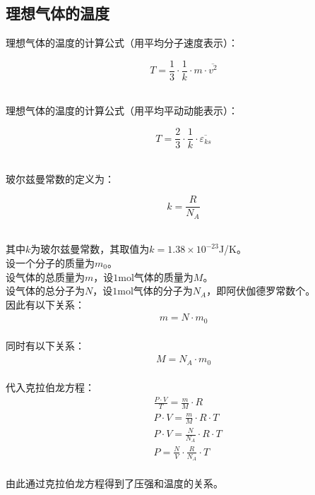 \documentclass[UTF8]{ctexart}
\begin{document}
\subsection{理想气体的温度}
    \setcounter{equation}{0}
    理想气体的温度的计算公式（用平均分子速度表示）：\vspace{5pt}
    \begin{large}
        \begin{equation*}
            T=\frac{1}{3}\cdot\frac{1}{k}\cdot m\cdot\overline{v^2}
        \end{equation*}
    \end{large}\\
    理想气体的温度的计算公式（用平均平动动能表示）：\vspace{5pt}
    \begin{large}
        \begin{equation*}
            T=\frac{2}{3}\cdot\frac{1}{k}\cdot\overline{\varepsilon_{ks}}
        \end{equation*}
    \end{large}\\
    玻尔兹曼常数的定义为：
    \begin{large}
        \begin{equation*}
            k=\frac{R}{N_A}
        \end{equation*}
    \end{large}\\
    其中$k$为玻尔兹曼常数，其取值为$k=1.38\times 10^{-23}$\si{J/K}。\\[6mm]
    设一个分子的质量为$m_0$。\\[3mm]
    设气体的总质量为$m$，设$1$\si{mol}气体的质量为$M$。\\[3mm]
    设气体的总分子为$N$，设$1$\si{mol}气体的分子为$N_A$，即阿伏伽德罗常数个。\\[5mm]
    因此有以下关系：
    \begin{align}
        m=N\cdot m_0
    \end{align}\\
    同时有以下关系：
    \begin{align}
        M=N_A\cdot m_0
    \end{align}\\
    代入克拉伯龙方程：
    \begin{align}
        &\frac{P\cdot V}{T}=\frac{m}{M}\cdot R\\[3mm]
        &P\cdot V=\frac{m}{M}\cdot R\cdot T\\[3mm]
        &P\cdot V=\frac{N}{N_A}\cdot R\cdot T\\[3mm]
        &P=\frac{N}{V}\cdot\frac{R}{N_A}\cdot T
    \end{align}\\
    由此通过克拉伯龙方程得到了压强和温度的关系。
\end{document}
